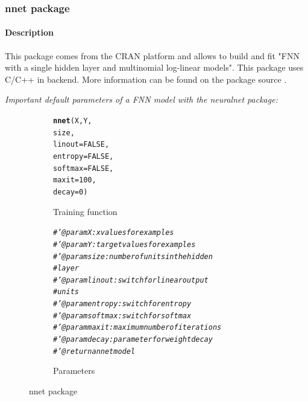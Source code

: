 \documentclass[letter,8pt]{article}\usepackage[]{graphicx}\usepackage[]{color}
\makeatletter
\newcommand{\hlnum}[1]{\textcolor[rgb]{0.686,0.059,0.569}{#1}}%
\newcommand{\hlcom}[1]{\textcolor[rgb]{0.678,0.584,0.686}{\textit{#1}}}%
\newcommand{\hlstd}[1]{\textcolor[rgb]{0.345,0.345,0.345}{#1}}%
\newcommand{\hlkwc}[1]{\textcolor[rgb]{0.333,0.667,0.333}{#1}}%
\newcommand{\hlkwd}[1]{\textcolor[rgb]{0.737,0.353,0.396}{\textbf{#1}}}%
\newenvironment{kframe}{%
 \def\at@end@of@kframe{}%
 \ifinner\ifhmode%
  \def\at@end@of@kframe{\end{minipage}}%
  \begin{minipage}{\columnwidth}%
 \fi\fi%
 \def\FrameCommand##1{\hskip\@totalleftmargin \hskip-\fboxsep
 \colorbox{shadecolor}{##1}\hskip-\fboxsep
     \hskip-\linewidth \hskip-\@totalleftmargin \hskip\columnwidth}%
 \MakeFramed {\advance\hsize-\width
   \@totalleftmargin\z@ \linewidth\hsize
   \@setminipage}}%
 {\par\unskip\endMakeFramed%
 \at@end@of@kframe}
\newenvironment{knitrout}{}{} %
\makeatother
\begin{document}
\subsubsection{\textbf{nnet package}}
\paragraph{Description}
This package comes from the CRAN platform and allows to build and fit "FNN with a single hidden layer and multinomial log-linear models". This package uses C/C++ in backend. More information can be found on the package source \cite{nnet2020}.

\textit{Important default parameters of a FNN model with the neuralnet package:}
\begin{figure}[H]
  \begin{subfigure}{0.5\textwidth}
\begin{knitrout}
\color{fgcolor}\begin{kframe}
\begin{alltt}
\hlkwd{nnet}\hlstd{(X, Y,}
     \hlstd{size,}
     \hlkwc{linout}\hlstd{=}\hlnum{FALSE}\hlstd{,}
     \hlkwc{entropy}\hlstd{=}\hlnum{FALSE}\hlstd{,}
     \hlkwc{softmax}\hlstd{=}\hlnum{FALSE}\hlstd{,}
     \hlkwc{maxit} \hlstd{=} \hlnum{100}\hlstd{,}
     \hlkwc{decay} \hlstd{=} \hlnum{0}\hlstd{)}
\end{alltt}
\end{kframe}
\end{knitrout}
    \caption{Training function}
  \end{subfigure}
  \begin{subfigure}{0.5\textwidth}
    \centering
\begin{knitrout}
\color{fgcolor}\begin{kframe}
\begin{alltt}
  \hlcom{#' @param X : x values for examples}
  \hlcom{#' @param Y : target values for examples}
  \hlcom{#' @param size : number of units in the hidden }
  \hlcom{#         layer}
  \hlcom{#' @param linout : switch for linear output }
  \hlcom{#         units}
  \hlcom{#' @param entropy : switch for entropy}
  \hlcom{#' @param softmax : switch for softmax}
  \hlcom{#' @param maxit : maximum number of iterations}
  \hlcom{#' @param decay : parameter for weight decay}
  \hlcom{#' @return a nnet model}
\end{alltt}
\end{kframe}
\end{knitrout}
    \caption{Parameters}
  \end{subfigure}
    \caption{nnet package}
\end{figure}
\end{document}

